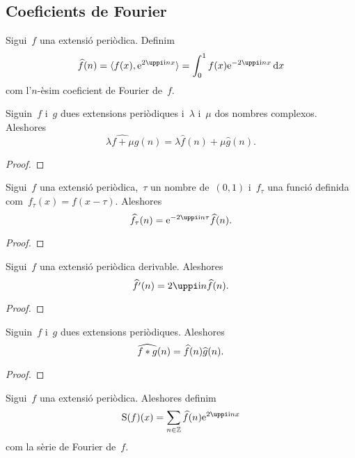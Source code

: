 \documentclass[../../main.tex]{subfiles}
\begin{document}
    \subsection{Coeficients de Fourier}
    \begin{definition}
        \label{def:coeficients de Fourier}
        Sigui~\(f\) una extensió periòdica.
        Definim
        \[
            \widehat{f}(n)=\langle f(x),\e^{2\uppi\iu nx}\rangle=\int_{0}^{1}f(x)\e^{-2\uppi\iu nx}\diff x
        \]
        com l'\(n\)-èsim coeficient de Fourier de~\(f\).
    \end{definition}
    \begin{proposition}
        Siguin~\(f\) i~\(g\) dues extensions periòdiques i~\(\lambda\) i~\(\mu\) dos nombres complexos.
        Aleshores
        \[
            \widehat{\lambda f+\mu g}(n)=\lambda\widehat{f}(n)+\mu\widehat{g}(n).
        \]
        \begin{proof}
        \end{proof}
    \end{proposition}
    \begin{proposition}
        Sigui~\(f\) una extensió periòdica,~\(\tau\) un nombre de~\((0,1)\) i~\(f_{\tau}\) una funció definida com~\(f_{\tau}(x)=f(x-\tau)\).
        Aleshores
        \[
            \widehat{f_{\tau}}(n)=\e^{-2\uppi\iu n\tau}\widehat{f}(n).
        \]
        \begin{proof}
        \end{proof}
    \end{proposition}
    \begin{proposition}
        Sigui~\(f\) una extensió periòdica derivable.
        Aleshores
        \[
            \widehat{f'}(n)=2\uppi\iu n\widehat{f}(n).
        \]
        \begin{proof}
        \end{proof}
    \end{proposition}
    \begin{proposition}
        Siguin~\(f\) i~\(g\) dues extensions periòdiques.
        Aleshores
        \[
            \widehat{f\mathbin{\ast} g}(n)=\widehat{f}(n)\widehat{g}(n).
        \]
        \begin{proof}
        \end{proof}
    \end{proposition}
    \begin{definition}
        \label{def:sèrie de Fourier}
        Sigui~\(f\) una extensió periòdica.
        Aleshores definim
        \[
            \sfourier(f)(x)=\sum_{n\in\mathbb{Z}}\widehat{f}(n)\e^{2\uppi\iu nx}
        \]
        com la sèrie de Fourier de~\(f\).
    \end{definition}
\end{document}
